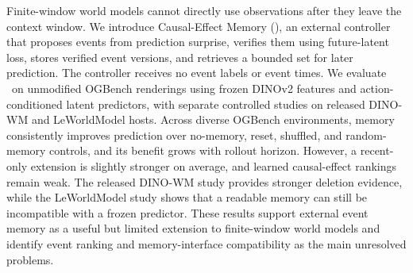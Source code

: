 Finite-window world models cannot directly use observations after they leave
the context window. We introduce Causal-Effect Memory (\cem), an external
controller that proposes events from prediction surprise, verifies them using
future-latent loss, stores verified event versions, and retrieves a bounded set
for later prediction. The controller receives no event labels or event times.
We evaluate \cem\ on unmodified OGBench renderings using frozen DINOv2 features
and action-conditioned latent predictors, with separate controlled studies on
released DINO-WM and LeWorldModel hosts. Across diverse OGBench environments,
memory consistently improves prediction over no-memory, reset, shuffled, and
random-memory controls, and its benefit grows with rollout horizon. However, a
recent-only extension is slightly stronger on average, and learned
causal-effect rankings remain weak. The released DINO-WM study provides
stronger deletion evidence, while the LeWorldModel study shows that a readable
memory can still be incompatible with a frozen predictor. These results support
external event memory as a useful but limited extension to finite-window world
models and identify event ranking and memory-interface compatibility as the
main unresolved problems.
